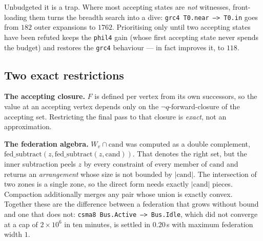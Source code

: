 Unbudgeted it is a trap. Where most accepting states are \emph{not} witnesses, front-loading them
turns the breadth search into a dive: \texttt{grc4 T0.near --> T0.in} goes from $182$ outer
expansions to $1762$. Prioritising only until two accepting states have been refuted keeps the
\texttt{phil4} gain (whose first accepting state never spends the budget) and restores the
\texttt{grc4} behaviour --- in fact improves it, to $118$. \measured{}

\subsection{Two exact restrictions}
\label{sec:otf:closure}

\textbf{The accepting closure.} $F$ is defined per vertex from its own successors, so the value at
an accepting vertex depends only on the $\lnot q$-forward-closure of the accepting set. Restricting
the final pass to that closure is \emph{exact}, not an approximation.

\textbf{The federation algebra.} $W_v \cap \mathrm{cand}$ was computed as a double complement,
$\mathrm{fed\_subtract}(z, \mathrm{fed\_subtract}(z, \mathrm{cand}))$. That denotes the right set,
but the inner subtraction peels $z$ by every constraint of every member of $\mathrm{cand}$ and
returns an \emph{arrangement} whose size is not bounded by $|\mathrm{cand}|$. The intersection of
two zones is a single zone, so the direct form needs exactly $|\mathrm{cand}|$ pieces. Compaction
additionally merges any pair whose union is exactly convex. Together these are the difference
between a federation that grows without bound and one that does not: \texttt{csma8 Bus.Active -->
Bus.Idle}, which did not converge at a cap of $2 \times 10^6$ in ten minutes, is settled in
$0.20$\,s with maximum federation width $1$. \measured{}
